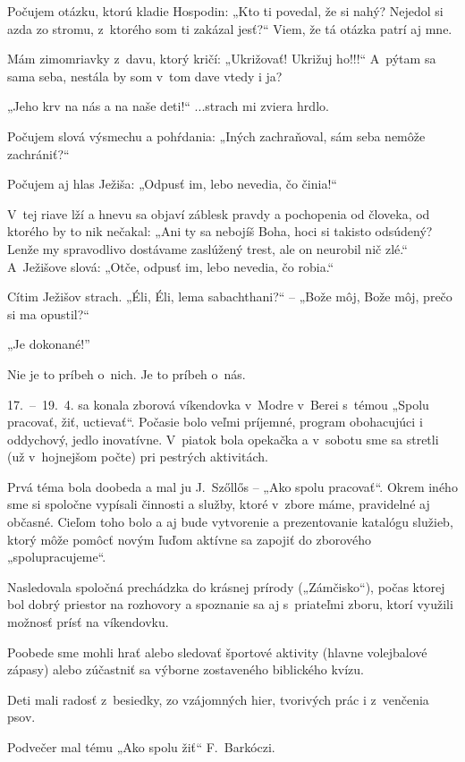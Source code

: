 Počujem otázku, ktorú kladie Hospodin: „Kto ti povedal, že si nahý? Nejedol si azda zo stromu, z~ktorého som ti zakázal jesť?“ Viem, že tá otázka patrí aj mne.

Mám zimomriavky z~davu, ktorý kričí: „Ukrižovať! Ukrižuj ho!!!“ A~pýtam sa sama seba, nestála by som v~tom dave vtedy i ja?

„Jeho krv na nás a na naše deti!“ ...strach mi zviera hrdlo.

Počujem slová výsmechu a pohŕdania: „Iných zachraňoval, sám seba nemôže zachrániť?“

Počujem aj hlas Ježiša: „Odpusť im, lebo nevedia, čo činia!“

V~tej riave lží a hnevu sa objaví záblesk pravdy a pochopenia od človeka, od ktorého by to nik nečakal: „Ani ty sa nebojíš Boha, hoci si takisto odsúdený? Lenže my spravodlivo dostávame zaslúžený trest, ale on neurobil nič zlé.“
A~Ježišove slová: „Otče, odpusť im, lebo nevedia, čo robia.“

Cítim Ježišov strach.
„Éli, Éli, lema sabachthani?“ -- „Bože môj, Bože môj, prečo si ma opustil?“

„Je dokonané!”

Nie je to príbeh o~nich. Je to príbeh o~nás.


17.~--~19.~4. sa konala zborová víkendovka v~Modre v~Berei s~témou „Spolu pracovať, žiť, uctievať“. Počasie bolo veľmi príjemné, program obohacujúci i oddychový, jedlo inovatívne. V~piatok bola opekačka a v~sobotu sme sa stretli (už v~hojnejšom počte) pri pestrých aktivitách.

Prvá téma bola doobeda a mal ju J.~Szőllős -- „Ako spolu pracovať“. Okrem iného sme si spoločne vypísali činnosti a služby, ktoré v~zbore máme, pravidelné aj občasné. Cieľom toho bolo a aj bude vytvorenie a prezentovanie katalógu služieb, ktorý môže pomôcť novým ľuďom aktívne sa zapojiť do zborového „spolupracujeme“.

Nasledovala spoločná prechádzka do krásnej prírody („Zámčisko“), počas ktorej bol dobrý priestor na rozhovory a spoznanie sa aj s~priateľmi zboru, ktorí využili možnosť prísť na víkendovku.

Poobede sme mohli hrať alebo sledovať športové aktivity (hlavne volejbalové zápasy) alebo zúčastniť sa výborne zostaveného biblického kvízu.

Deti mali radosť z~besiedky, zo vzájomných hier, tvorivých prác i z~venčenia psov.

Podvečer mal tému „Ako spolu žiť“ F.~Barkóczi.

